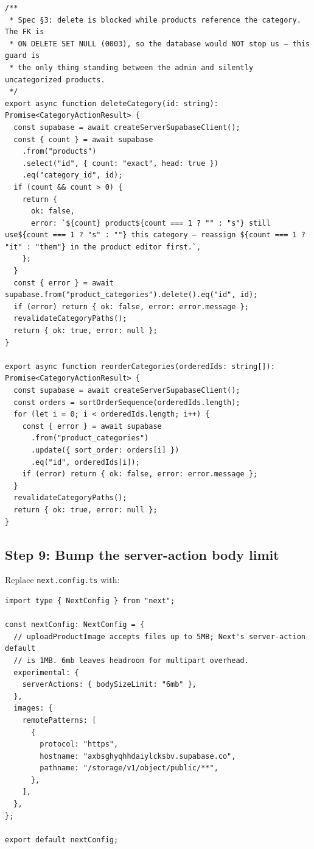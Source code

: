 \documentclass[11pt,a4paper]{article}
\begin{document}
\begin{lstlisting}
/**
 * Spec §3: delete is blocked while products reference the category. The FK is
 * ON DELETE SET NULL (0003), so the database would NOT stop us — this guard is
 * the only thing standing between the admin and silently uncategorized products.
 */
export async function deleteCategory(id: string): Promise<CategoryActionResult> {
  const supabase = await createServerSupabaseClient();
  const { count } = await supabase
    .from("products")
    .select("id", { count: "exact", head: true })
    .eq("category_id", id);
  if (count && count > 0) {
    return {
      ok: false,
      error: `${count} product${count === 1 ? "" : "s"} still use${count === 1 ? "s" : ""} this category — reassign ${count === 1 ? "it" : "them"} in the product editor first.`,
    };
  }
  const { error } = await supabase.from("product_categories").delete().eq("id", id);
  if (error) return { ok: false, error: error.message };
  revalidateCategoryPaths();
  return { ok: true, error: null };
}

export async function reorderCategories(orderedIds: string[]): Promise<CategoryActionResult> {
  const supabase = await createServerSupabaseClient();
  const orders = sortOrderSequence(orderedIds.length);
  for (let i = 0; i < orderedIds.length; i++) {
    const { error } = await supabase
      .from("product_categories")
      .update({ sort_order: orders[i] })
      .eq("id", orderedIds[i]);
    if (error) return { ok: false, error: error.message };
  }
  revalidateCategoryPaths();
  return { ok: true, error: null };
}
\end{lstlisting}

\subsection*{Step 9: Bump the server-action body limit}

Replace \texttt{next.config.ts} with:

\begin{lstlisting}
import type { NextConfig } from "next";

const nextConfig: NextConfig = {
  // uploadProductImage accepts files up to 5MB; Next's server-action default
  // is 1MB. 6mb leaves headroom for multipart overhead.
  experimental: {
    serverActions: { bodySizeLimit: "6mb" },
  },
  images: {
    remotePatterns: [
      {
        protocol: "https",
        hostname: "axbsghyqhhdaiylcksbv.supabase.co",
        pathname: "/storage/v1/object/public/**",
      },
    ],
  },
};

export default nextConfig;
\end{lstlisting}
\end{document}
